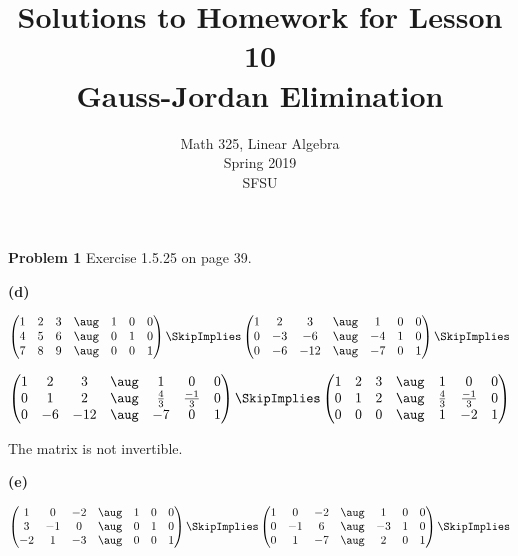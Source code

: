 \documentclass[oneside,12pt]{amsart}
\begin{document}
\title{Solutions to Homework for Lesson 10 \\ Gauss-Jordan Elimination}
\author{Math 325, Linear Algebra \\ Spring 2019\\ SFSU }
\date{}

\maketitle


\textbf{Problem 1}  Exercise 1.5.25 on page 39.

\bigskip


\textbf{(d)}

\bigskip

$
\begin{pmatrix}
1 & 2 & 3 & \aug & 1 & 0 & 0 \\
4 & 5 & 6 & \aug & 0 & 1 & 0 \\
7 & 8 & 9 & \aug &  0 & 0 & 1
\end{pmatrix}
\SkipImplies
\begin{pmatrix}
1 & 2 & 3 &    \aug &  1 & 0 & 0 \\
0 & -3 & -6 &  \aug & -4 & 1 & 0 \\
0 & -6 & -12 & \aug & -7 & 0 & 1
\end{pmatrix}
\SkipImplies
$

\bigskip

$
\begin{pmatrix}
1 & 2  & 3   &  \aug &   1 & 0 & 0 \\
0 & 1  & 2   &  \aug &  \frac{4}{3} & \frac{-1}{3} & 0 \\
0 & -6 & -12 &  \aug &   -7 & 0 & 1
\end{pmatrix}
\SkipImplies
\begin{pmatrix}
1 & 2 & 3 &  \aug & 1 & 0 & 0 \\
0 & 1 & 2 &  \aug & \frac{4}{3} & \frac{-1}{3} & 0 \\
0 & 0 & 0 &  \aug & 1 & -2 & 1
\end{pmatrix}
$

\bigskip

The matrix is not invertible.

\bigskip

\textbf{(e)}

\bigskip

$
\begin{pmatrix}
1  & 0  & -2 & \aug &  1 & 0 & 0 \\
3  & -1 &  0 & \aug &  0 & 1 & 0 \\
-2 & 1  & -3 & \aug &  0 & 0 & 1
\end{pmatrix}
\SkipImplies
\begin{pmatrix}
1 & 0  & -2  & \aug & 1 & 0 & 0 \\
0 & -1 & 6   & \aug & -3 & 1 & 0 \\
0 & 1  & -7  & \aug & 2 & 0 & 1
\end{pmatrix}
\SkipImplies
$
\end{document}

